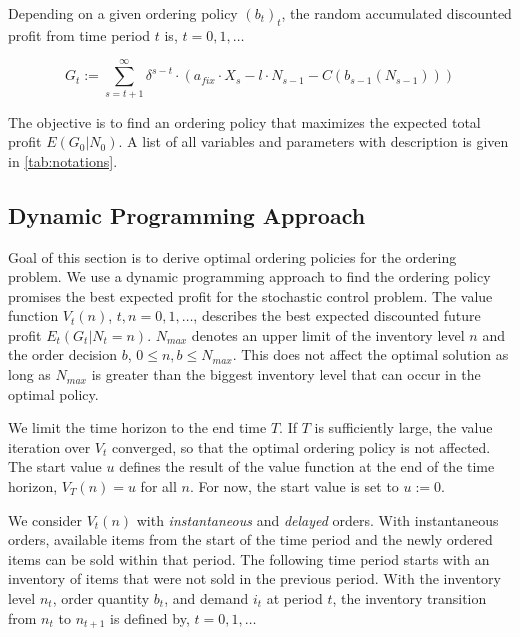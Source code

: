 Depending on a given ordering policy $(b_t)_t$, the random accumulated discounted profit from time period $t$ is, $t = 0, 1, \ldots$

$$
G_t := \sum_{s=t+1}^{\infty} \delta^{s-t} \cdot (a_{fix} \cdot X_s - l \cdot N_{s-1} - C(b_{s-1}(N_{s-1})))
$$

The objective is to find an ordering policy that maximizes the expected total profit $E(G_0 | N_0)$.
A list of all variables and parameters with description is given in \cref{tab:notations}.


\subsection{Dynamic Programming Approach}
\label{section:ordering_solution}

Goal of this section is to derive optimal ordering policies for the ordering problem.
We use a dynamic programming approach to find the ordering policy promises the best expected profit for the stochastic control problem.
The value function $V_t(n)$, $t, n = 0, 1, \ldots$, describes the best expected discounted future profit $E_t(G_t | N_t=n)$.
$N_{max}$ denotes an upper limit of the inventory level $n$ and the order decision $b$, $0 \leq n, b \leq N_{max}$. This does not affect the optimal solution as long as $N_{max}$ is greater than the biggest inventory level that can occur in the optimal policy.

We limit the time horizon to the end time $T$.
If $T$ is sufficiently large, the value iteration over $V_t$ converged, so that the optimal ordering policy is not affected.
The start value $u$ defines the result of the value function at the end of the time horizon, $V_T(n) = u$ for all $n$.
For now, the start value is set to $u := 0$.

We consider $V_t(n)$ with \textit{instantaneous} and \textit{delayed} orders.
With instantaneous orders, available items from the start of the time period and the newly ordered items can be sold within that period.
The following time period starts with an inventory of items that were not sold in the previous period.
With the inventory level $n_t$, order quantity $b_t$, and demand $i_t$ at period $t$, the inventory transition from $n_t$ to $n_{t+1}$ is defined by, $t = 0, 1, \ldots$

